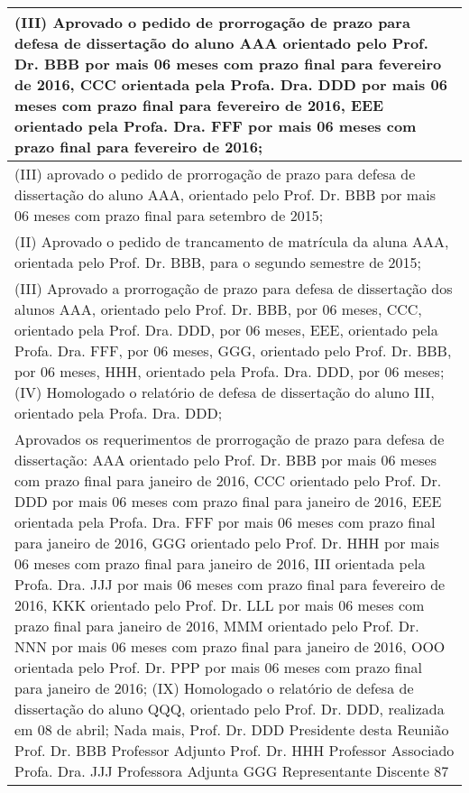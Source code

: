 
\begin{longtable}{|p{17.5cm}|}
\hline 
(III) Aprovado o pedido de prorrogação de prazo para defesa de dissertação do aluno AAA orientado pelo Prof. Dr. BBB por mais 06 meses com prazo final para fevereiro de 2016, CCC orientada pela Profa. Dra. DDD por mais 06 meses com prazo final para fevereiro de 2016, EEE orientado pela Profa. Dra. FFF por mais 06 meses com prazo final para fevereiro de 2016;

 \\ \hline 
(III) aprovado o pedido de prorrogação de prazo para defesa de dissertação do aluno AAA, orientado pelo Prof. Dr. BBB por mais 06 meses com prazo final para setembro de 2015;

 \\ \hline 
(II) Aprovado o pedido de trancamento de matrícula da aluna AAA, orientada pelo Prof. Dr. BBB, para o segundo semestre de 2015;

 \\ \hline 
(III) Aprovado a prorrogação de prazo para defesa de dissertação dos alunos AAA, orientado pelo Prof. Dr. BBB, por 06 meses, CCC, orientado pela Prof. Dra. DDD, por 06 meses, EEE, orientado pela Profa. Dra. FFF, por 06 meses, GGG, orientado pelo Prof. Dr. BBB, por 06 meses, HHH, orientado pela Profa. Dra. DDD, por 06 meses; (IV) Homologado o relatório de defesa de dissertação do aluno III, orientado pela Profa. Dra. DDD;

 \\ \hline 
Aprovados os requerimentos de prorrogação de prazo para defesa de dissertação: AAA orientado pelo Prof. Dr. BBB por mais 06 meses com prazo final para janeiro de 2016, CCC orientado pelo Prof. Dr. DDD por mais 06 meses com prazo final para janeiro de 2016, EEE orientada pela Profa. Dra. FFF por mais 06 meses com prazo final para janeiro de 2016, GGG orientado pelo Prof. Dr. HHH por mais 06 meses com prazo final para janeiro de 2016, III orientada pela Profa. Dra. JJJ por mais 06 meses com prazo final para fevereiro de 2016, KKK orientado pelo Prof. Dr. LLL por mais 06 meses com prazo final para janeiro de 2016, MMM orientado pelo Prof. Dr. NNN por mais 06 meses com prazo final para janeiro de 2016, OOO orientada pelo Prof. Dr. PPP por mais 06 meses com prazo final para janeiro de 2016; (IX) Homologado o relatório de defesa de dissertação do aluno QQQ, orientado pelo Prof. Dr. DDD, realizada em 08 de abril; Nada mais, Prof. Dr. DDD Presidente desta Reunião Prof. Dr. BBB Professor Adjunto Prof. Dr. HHH Professor Associado Profa. Dra. JJJ Professora Adjunta GGG Representante Discente 87

 \\ \hline 

\end{longtable} 





